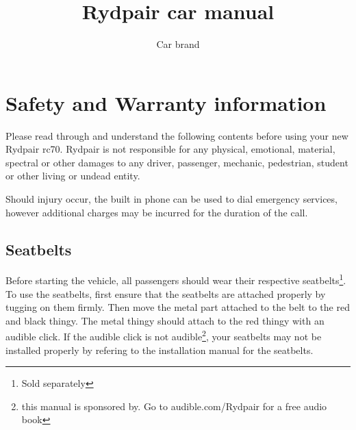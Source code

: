 \documentclass{article}
\title{Rydpair car manual}
\author{Car brand}
\newcommand{\carbrand}{Rydpair}
\newcommand{\carmodel}{rc70}
\begin{document}
    \maketitle

    \section{Safety and Warranty information}
    Please read through and understand the following contents before using your
    new \carbrand{\textregistered} \carmodel{\texttrademark}.
    \carbrand{\textregistered} is not responsible for any physical, emotional,
    material, spectral or other damages to any driver, passenger, mechanic,
    pedestrian, student or other living or undead entity.

    Should injury occur, the built in phone can be used to dial emergency services,
    however additional charges may be incurred for the duration of the call.

    \subsection{Seatbelts}

    Before starting the vehicle, all passengers should wear their respective
    seatbelts\footnote{Sold separately}. To use the seatbelts, first ensure
    that the seatbelts are attached properly by tugging on them firmly. Then
    move the metal part attached to the belt to the red and black thingy. The
    metal thingy should attach to the red thingy with an audible click. If the
    audible click is not audible\footnote{this manual is sponsored by. Go to
    audible.com/\carbrand{} for a free audio book}, your seatbelts may not be
    installed properly by refering to the installation manual for the
    seatbelts.
\end{document}
